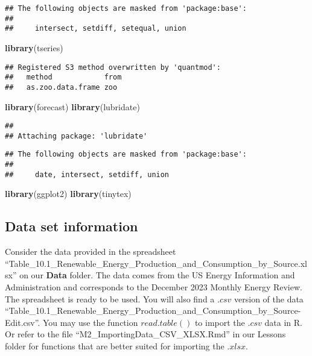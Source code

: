 \documentclass[
]{article}
\newenvironment{Shaded}{\begin{snugshade}}{\end{snugshade}}
\newcommand{\FunctionTok}[1]{\textcolor[rgb]{0.13,0.29,0.53}{\textbf{#1}}}
\newcommand{\NormalTok}[1]{#1}
\begin{document}
\begin{verbatim}
## The following objects are masked from 'package:base':
## 
##     intersect, setdiff, setequal, union
\end{verbatim}

\begin{Shaded}
\begin{Highlighting}[]
\FunctionTok{library}\NormalTok{(tseries)}
\end{Highlighting}
\end{Shaded}

\begin{verbatim}
## Registered S3 method overwritten by 'quantmod':
##   method            from
##   as.zoo.data.frame zoo
\end{verbatim}

\begin{Shaded}
\begin{Highlighting}[]
\FunctionTok{library}\NormalTok{(forecast) }
\FunctionTok{library}\NormalTok{(lubridate)}
\end{Highlighting}
\end{Shaded}

\begin{verbatim}
## 
## Attaching package: 'lubridate'
\end{verbatim}

\begin{verbatim}
## The following objects are masked from 'package:base':
## 
##     date, intersect, setdiff, union
\end{verbatim}

\begin{Shaded}
\begin{Highlighting}[]
\FunctionTok{library}\NormalTok{(ggplot2)}
\FunctionTok{library}\NormalTok{(tinytex)}
\end{Highlighting}
\end{Shaded}

\hypertarget{data-set-information}{%
\subsection{Data set information}\label{data-set-information}}

Consider the data provided in the spreadsheet
``Table\_10.1\_Renewable\_Energy\_Production\_and\_Consumption\_by\_Source.xlsx''
on our \textbf{Data} folder. The data comes from the US Energy
Information and Administration and corresponds to the December 2023
Monthly Energy Review. The spreadsheet is ready to be used. You will
also find a \(.csv\) version of the data
``Table\_10.1\_Renewable\_Energy\_Production\_and\_Consumption\_by\_Source-Edit.csv''.
You may use the function \(read.table()\) to import the \(.csv\) data in
R. Or refer to the file ``M2\_ImportingData\_CSV\_XLSX.Rmd'' in our
Lessons folder for functions that are better suited for importing the
\(.xlsx\).
\end{document}
